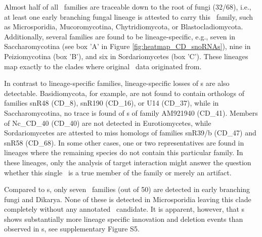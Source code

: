 Almost half of all \cd\
families are traceable down to the root of fungi (32/68), i.e., at least one early
branching fungal lineage is attested to carry this \sno\
family, such as Microsporidia, Mucoromycotina, Chytridiomycota, or
Blastocladiomycota. Additionally, several families are found to be
lineage-specific, e.g., seven in Saccharomycotina (see box 'A' in
Figure \ref{fig:heatmap_CD_snoRNAs}), nine in Peiziomycotina (box
'B'), and six in Sordariomycetes (box 'C'). These lineages map exactly to the
clades where original \sno\ data originated from.


In contrast to lineage-specific families, lineage-specific losses of
\sno s are also detectable. Basidiomycota, for example, are not found
to contain orthologs of families snR48 (CD\_8), snR190 (CD\_16), or U14 (CD\_37), while in
Saccharomycotina, no trace is found of \sno s of family AM921940
(CD\_41). Members of Nc\_CD\_40 (CD\_40) are not detected in Eurotiomycetes, while
Sordariomycetes are attested to miss homologs of families snR39/b (CD\_47) and
snR58 (CD\_68). In some other cases, one or two representatives are found in
lineages where the remaining species do not contain this particular
family. In these lineages, only the analysis of target interaction
might answer the question whether this single \sno\ is a true member
of the family or merely an artifact.


%

Compared to \cd s, only seven \haca\ families (out of 50) are detected in early branching fungi
and Dikarya. None of these is detected in Microsporidia
leaving this clade completely without any annotated \sno\ candidate. It
is apparent, however, that \haca s shows substantially
more lineage specific innovation and deletion events than observed in \cd s, see supplementary Figure S5.

